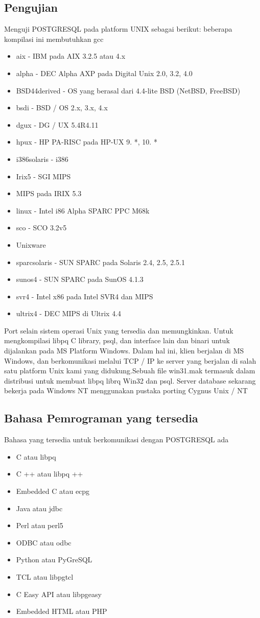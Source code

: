 \subsection{Pengujian}
Menguji POSTGRESQL pada platform UNIX sebagai berikut: 
beberapa kompilasi ini membutuhkan gcc
\begin {itemize} 
	\item aix - IBM pada AIX 3.2.5 atau 4.x
	\item alpha - DEC Alpha AXP pada Digital Unix 2.0, 3.2, 4.0
	\item BSD44derived - OS yang berasal dari 4.4-lite BSD (NetBSD, FreeBSD)
	\item bsdi - BSD / OS 2.x, 3.x, 4.x
	\item dgux - DG / UX 5.4R4.11
	\item hpux - HP PA-RISC pada HP-UX 9. *, 10. *
	\item i386solaris - i386
	\item Irix5 - SGI MIPS
	\item MIPS pada IRIX 5.3
	\item linux - Intel i86 Alpha SPARC PPC M68k
	\item sco - SCO 3.2v5
	\item Unixware
	\item sparcsolaris - SUN SPARC pada Solaris 2.4, 2.5, 2.5.1
	\item sunos4 - SUN SPARC pada SunOS 4.1.3
	\item svr4 - Intel x86 pada Intel SVR4 dan MIPS
	\item ultrix4 - DEC MIPS di Ultrix 4.4
\end {itemize}

Port selain sistem operasi Unix yang tersedia dan memungkinkan. 
Untuk mengkompilasi libpq C library, psql, dan interface lain dan binari untuk dijalankan pada MS Platform Windows. Dalam hal ini, klien berjalan di MS Windows, dan berkomunikasi melalui TCP / IP ke server yang berjalan di salah satu platform Unix kami yang didukung.Sebuah file win31.mak termasuk dalam distribusi untuk membuat libpq librq Win32 dan psql. 
Server database sekarang bekerja pada Windows NT menggunakan pustaka porting Cygnus Unix / NT

\subsection {Bahasa Pemrograman yang tersedia}
Bahasa yang tersedia untuk berkomunikasi dengan POSTGRESQL ada
 \begin {itemize}
	\item C atau libpq
	\item C ++ atau libpq ++
	\item Embedded C atau ecpg
	\item Java atau jdbc
	\item Perl atau perl5
	\item ODBC atau odbc
	\item Python atau PyGreSQL
	\item TCL atau libpgtcl
	\item C Easy API atau libpgeasy
	\item Embedded HTML atau PHP
\end {itemize}

